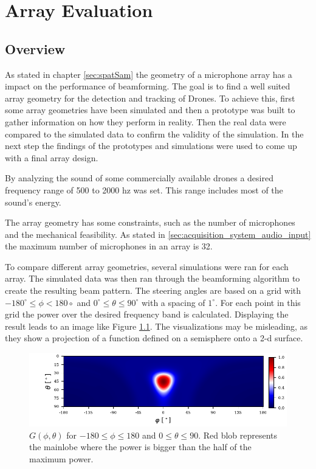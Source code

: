 \chapter{Array Evaluation}
\label{chap:aev}
\section{Overview}
As stated in chapter \ref*{sec:spatSam} the geometry of a microphone array
has a impact on the performance of beamforming.
The goal is to find a well suited array geometry for the detection and tracking of
Drones.
To achieve this, first some array geometries have been simulated and then
a prototype was built to gather information on how they perform in reality.
Then the real data were compared to the simulated data to
confirm the validity of the simulation.
In the next step the findings of the prototypes and simulations
were used to come up with a final array design.

By analyzing the sound of some commercially available drones
a desired frequency range of 500 to 2000 hz was set.
This range includes most of the sound's energy.

The array geometry has some constraints,
such as the number of microphones and the mechanical feasibility.
As stated in \ref*{sec:acquisition_system_audio_input} the maximum number 
of microphones in an array is 32.

To compare different array geometries, several simulations
were ran for each array.
The simulated data was then ran through the beamforming
algorithm to create the resulting beam pattern.
The steering angles are based on a grid with $-180^\circ \leq \phi < 180\circ$ and
$0^\circ \leq \theta \leq 90^\circ$ with a spacing of $1^\circ$.
For each point in this grid the power over the desired frequency band is calculated.
Displaying the result leads to an image like Figure \ref*{aev:fig:gridEx}.
The visualizations may be misleading, as they show a projection of 
a function defined on a semisphere onto a 2-d surface.
\begin{figure}
	\centering
	\includegraphics[]{images/5_array_evaluation/0.3_0.79.pdf}
	\caption{$G(\phi, \theta)$ for $-180 \leq \phi \leq 180$ and $0 \leq \theta \leq 90$.
	Red blob represents the mainlobe where the power is bigger than the half of the 
	maximum power.}
	\label{aev:fig:gridEx}
\end{figure}
